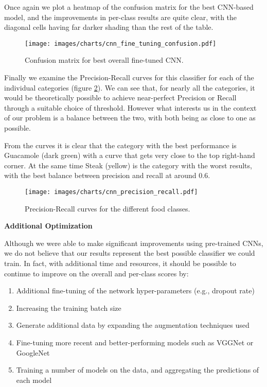 \documentclass[10pt,a4paper]{article}
\begin{document}
Once again we plot a heatmap of the confusion matrix for the best CNN-based model, and the improvements in per-class results are quite clear, with the diagonal cells having far darker shading than the rest of the table.

\begin{figure}[h]
\begin{framed}
\caption{Confusion matrix for best overall fine-tuned CNN.}
  \texttt{[image: images/charts/cnn\_fine\_tuning\_confusion.pdf]}
  \label{fig:fine-tuning-confusion}
\end{framed}
\end{figure}

Finally we examine the Precision-Recall curves for this classifier for each of the individual categories (figure \ref{fig:cnn_precision_recall}). We can see that, for nearly all the categories, it would be theoretically possible to achieve near-perfect Precision or Recall through a suitable choice of threshold. However what interests us in the context of our problem is a balance between the two, with both being as close to one as possible.

From the curves it is clear that the category with the best performance is Guacamole (dark green) with a curve that gets very close to the top right-hand corner. At the same time Steak (yellow) is the category with the worst results, with the best balance between precision and recall at around 0.6.

\begin{figure}[h]
\begin{framed}
  \caption{Precision-Recall curves for the different food classes.}
  \texttt{[image: images/charts/cnn\_precision\_recall.pdf]}
  \label{fig:cnn_precision_recall}
\end{framed}
\end{figure}

\textbf{Additional Optimization}

Although we were able to make significant improvements using pre-trained CNNs, we do not believe that our results represent the best possible classifier we could train. In fact, with additional time and resources, it should be possible to continue to improve on the overall and per-class scores by:

\begin{enumerate}
\item Additional fine-tuning of the network hyper-parameters (e.g., dropout rate)
\item Increasing the training batch size
\item Generate additional data by expanding the augmentation techniques used
\item Fine-tuning more recent and better-performing models such as VGGNet or GoogleNet
\item Training a number of models on the data, and aggregating the predictions of each model
\end{enumerate}
\end{document}
